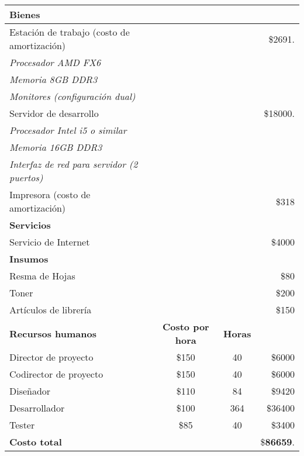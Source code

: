 \begin{center}

	\begin{tabular}{l c c r}
		\hline \hline
		
		\textbf{Bienes} & & & \\ \hline
		Estación de trabajo (costo de amortización)& & & \$2691. \\
		\textit{Procesador AMD FX6} & & &\\
		\textit{Memoria 8GB DDR3} & & & \\
		\textit{Monitores (configuración dual)} & & & \\
		\hline
		Servidor de desarrollo & & & \$18000. \\
		\textit{Procesador Intel i5 o similar} & & & \\
		\textit{Memoria 16GB DDR3} & & & \\
		\textit{Interfaz de red para servidor (2 puertos)} & & & \\
		\hline
		Impresora (costo de amortización) & & & \$318 \\
		\hline \hline
		
		\textbf{Servicios} & & &\\ \hline
		Servicio de Internet & & & \$4000 \\
		\hline \hline
		\textbf{Insumos} & & &\\ \hline
		Resma de Hojas & & & \$80 \\
		Toner & & & \$200 \\
		Artículos de librería & & & \$150 \\
		\hline \hline
		\textbf{Recursos humanos} & \textbf{Costo por hora} & \textbf{Horas} & \\
		Director de proyecto & \$150 & 40 & \$6000 \\
		Codirector de proyecto & \$150 & 40 & \$6000 \\
		Diseñador & \$110 & 84 & \$9420 \\
		Desarrollador & \$100 & 364 & \$36400 \\
		Tester & \$85 & 40 & \$3400 \\
		\hline \hline
		\textbf{Costo total} & & & \$\textbf{86659}.
	\end{tabular}
\end{center}



